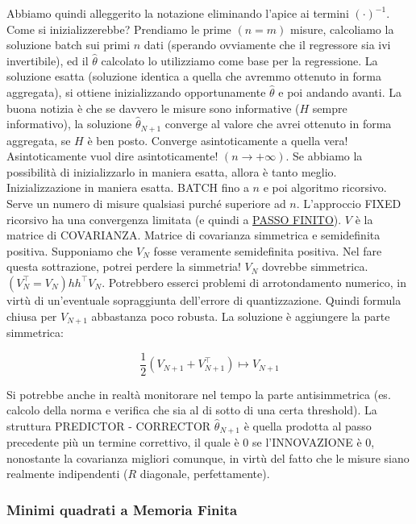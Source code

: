 Abbiamo quindi alleggerito la notazione eliminando l'apice ai termini $(\mathord{\cdot})^{-1}$. Come si inizializzerebbe? Prendiamo le prime $(n=m)$ misure, calcoliamo la soluzione batch sui primi $n$ dati (sperando ovviamente che il regressore sia ivi invertibile), ed il $\hat{\theta}$ calcolato lo utilizziamo come base per la regressione. La soluzione esatta (soluzione identica a quella che avremmo ottenuto in forma aggregata), si ottiene inizializzando opportunamente $\hat{\theta}$ e poi andando avanti. La buona notizia è che se davvero le misure sono informative ($H$ sempre informativo), la soluzione $\hat{\theta}_{N+1}$ converge al valore che avrei ottenuto in forma aggregata, se $H$ è ben posto. Converge asintoticamente a quella vera! Asintoticamente vuol dire asintoticamente! $(n\to +\infty)$. Se abbiamo la possibilità di inizializzarlo in maniera esatta, allora è tanto meglio. Inizializzazione in maniera esatta. BATCH fino a $n$ e poi algoritmo ricorsivo. Serve un numero di misure qualsiasi purché superiore ad $n$. L'approccio FIXED ricorsivo ha una convergenza limitata (e quindi a \underline{PASSO FINITO}). $V$ è la matrice di COVARIANZA. Matrice di covarianza simmetrica e semidefinita positiva. Supponiamo che $V_N$ fosse veramente semidefinita positiva. Nel fare questa sottrazione, potrei perdere la simmetria! $V_N$ dovrebbe simmetrica. $(V_N^\top=V_N)hh^\top V_N$. Potrebbero esserci problemi di arrotondamento numerico, in virtù di un'eventuale sopraggiunta dell'errore di quantizzazione. Quindi formula chiusa per $V_{N+1}$ abbastanza poco robusta. La soluzione è aggiungere la parte simmetrica:

\[
	\frac{1}{2}(V_{N+1}+V_{N+1}^\top) \mapsto V_{N+1}
\]

Si potrebbe anche in realtà monitorare nel tempo la parte antisimmetrica (es. calcolo della norma e verifica che sia al di sotto di una certa threshold). La struttura PREDICTOR - CORRECTOR $\hat{\theta}_{N+1}$ è quella prodotta al passo precedente più un termine correttivo, il quale è 0 se l'INNOVAZIONE è 0, nonostante la covarianza migliori comunque, in virtù del fatto che le misure siano realmente indipendenti ($R$ diagonale, perfettamente).

\subsubsection{Minimi quadrati a Memoria Finita}

